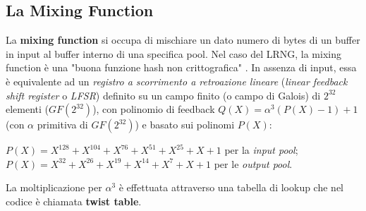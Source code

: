 \documentclass{article}
\begin{document}
 
 \subsection{La Mixing Function}\label{mixingfunction}
 La \textbf{mixing function} si occupa di mischiare un dato numero di bytes di
 un buffer in input al buffer interno di una specifica pool. Nel caso del LRNG,
 la mixing function è una "buona funzione hash non crittografica" \cite{lach}.
 In assenza di input, essa è equivalente ad un \emph{registro a scorrimento a
 retroazione lineare} (\emph{linear feedback shift register} o \emph{LFSR})
 definito su un campo finito (o campo di Galois) di $2^{32}$ elementi
 ($GF(2^{32})$), con polinomio di feedback $Q(X)=\alpha^3(P(X)-1)+1$ (con
 $\alpha$ primitiva di $GF(2^{32})$) e basato sui polinomi $P(X)$:
 \begin{center}
 $P(X)=X^{128}+X^{104}+X^{76}+X^{51}+X^{25}+X+1$ per la \emph{input pool};
 $P(X)=X^{32}+X^{26}+X^{19}+X^{14}+X^{7}+X+1$ per le \emph{output pool}.
 \end{center}
 La moltiplicazione per $\alpha^3$ è effettuata attraverso una tabella di lookup
 che nel codice è chiamata \textbf{twist table}.
 
\end{document}

